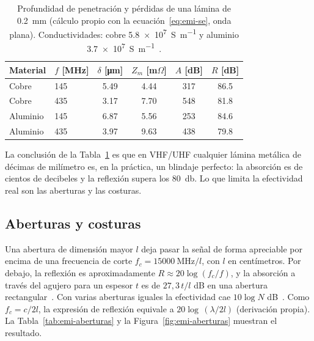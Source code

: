 \begin{table}[H]
  \centering
  \caption[Blindaje de una lámina de 0,2 mm de cobre o aluminio.]{Profundidad de penetración y pérdidas de una lámina de \SI{0,2}{\milli\metre} (cálculo propio con la ecuación~\eqref{eq:emi-se}, onda plana). Conductividades: cobre \SI{5,8e7}{\siemens\per\metre} y aluminio \SI{3,7e7}{\siemens\per\metre}~\cite{rosehulman}.}\label{tab:emi-lamina}
  \begin{tabular}{@{}llcccc@{}}
    \toprule
    Material & $f$ [MHz] & $\delta$ [\si{\micro\metre}] & $Z_m$ [m$\Omega$] & $A$ [dB] & $R$ [dB] \\
    \midrule
    Cobre    & 145 & \num{5,49} & \num{4,44} & 317 & \num{86,5} \\
    Cobre    & 435 & \num{3,17} & \num{7,70} & 548 & \num{81,8} \\
    Aluminio & 145 & \num{6,87} & \num{5,56} & 253 & \num{84,6} \\
    Aluminio & 435 & \num{3,97} & \num{9,63} & 438 & \num{79,8} \\
    \bottomrule
  \end{tabular}
\end{table}

La conclusión de la Tabla~\ref{tab:emi-lamina} es que en VHF/UHF cualquier lámina metálica de décimas de milímetro es, en la práctica, un blindaje perfecto: la absorción es de cientos de decibeles y la reflexión supera los \SI{80}{\decibel}. Lo que limita la efectividad real son las aberturas y las costuras.

\subsection{Aberturas y costuras}\label{sec:emi-aberturas}

Una abertura de dimensión mayor $l$ deja pasar la señal de forma apreciable por encima de una frecuencia de corte $f_c = \SI{15000}{\mega\hertz} / l$, con $l$ en centímetros. Por debajo, la reflexión es aproximadamente $R \approx 20\log (f_c/f)$, y la absorción a través del agujero para un espesor $t$ es de $27{,}3\,t/l$ dB en una abertura rectangular~\cite{rosehulman}. Con varias aberturas iguales la efectividad cae $10\log N$ dB~\cite{rosehulman}. Como $f_c = c/2l$, la expresión de reflexión equivale a $20\log\,(\lambda/2l)$ (derivación propia). La Tabla~\ref{tab:emi-aberturas} y la Figura~\ref{fig:emi-aberturas} muestran el resultado.

